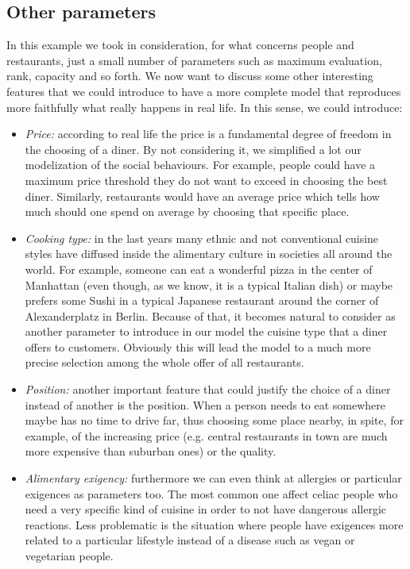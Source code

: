 \documentclass[10pt,a4paper,usenatbib]{article}
\begin{document}
\subsection{Other parameters}
In this example we took in consideration, for what concerns people and restaurants, just a small number of parameters such as maximum evaluation, rank, capacity and so forth. We now want to discuss some other interesting features that we could introduce to have a more complete model that reproduces more faithfully what really happens in real life. In this sense, we could introduce:
\begin{itemize}
\item \textit{Price:} according to real life the price is a fundamental degree of freedom in the choosing of a diner. By not considering it, we simplified a lot our modelization of the social behaviours. For example, people could have a maximum price threshold they do not want to exceed in choosing the best diner. Similarly, restaurants would have an average price which tells how much should one spend on average by choosing that specific place.
\item \textit{Cooking type:} in the last years many ethnic and not conventional cuisine styles have diffused inside the alimentary culture in societies all around the world. For example, someone can eat a wonderful pizza in the center of Manhattan (even though, as we know, it is a typical Italian dish) or maybe prefers some Sushi in a typical Japanese restaurant around the corner of Alexanderplatz in Berlin. Because of that, it becomes natural to consider as another parameter to introduce in our model the cuisine type that a diner offers to customers. Obviously this will lead the model to a much more precise selection among the whole offer of all restaurants.
\item \textit{Position:} another important feature that could justify the choice of a diner instead of another is the position. When a person needs to eat somewhere maybe has no time to drive far, thus choosing some place nearby, in spite, for example, of the increasing price (e.g. central restaurants in town are much more expensive than suburban ones) or the quality. 
\item \textit{Alimentary exigency:} furthermore we can even think at allergies or particular exigences as parameters too. The most common one affect celiac people who need a very specific kind of cuisine in order to not have dangerous allergic reactions. Less problematic is the situation where people have exigences more related to a particular lifestyle instead of a disease such as vegan or vegetarian people.
\end{itemize}
\end{document}
